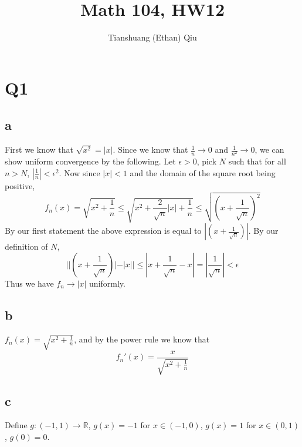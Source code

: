 \documentclass[12pt]{article}
\author{Tianshuang (Ethan) Qiu}
\newcommand{\R}{\mathbb{R}}
\begin{document}
\title{Math 104, HW12}
\maketitle
\newpage

\section{Q1}
\subsection{a}
First we know that $\sqrt{x^2} = |x|$. Since we know that $\frac{1}{n} \to 0$ and $\frac{1}{n^2} \to 0$, we can show uniform convergence by the following.
\newline
Let $\epsilon > 0$, pick $N$ such that for all $n > N$, $|\frac{1}{n}| < \epsilon^2$. Now since $|x| < 1$ and the domain of the square root being positive,
$$f_n(x) = \sqrt{x^2 + \frac{1}{n}} \leq \sqrt{x^2 + \frac{2}{\sqrt{n}}|x| + \frac{1}{n}} \leq \sqrt{(x+\frac{1}{\sqrt{n}})^2}$$
By our first statement the above expression is equal to $|(x+\frac{1}{\sqrt{n}})|$. By our definition of $N$,
$$||(x+\frac{1}{\sqrt{n}})| - |x|| \leq |x+\frac{1}{\sqrt{n}}-x| = |\frac{1}{\sqrt{n}}| < \epsilon$$
Thus we have $f_n \to |x|$ uniformly.

\subsection{b}
$f_n(x) = \sqrt{x^2 + \frac{1}{n}}$, and by the power rule we know that
$$f_n'(x) = \frac{x}{\sqrt{x^2+\frac{1}{n}}}$$

\subsection{c}
Define $g: (-1,1) \to \R$, $g(x) = -1 $ for $x \in (-1,0)$, $g(x) = 1 $ for $x \in (0, 1)$, $g(0)=0.$
\end{document}
